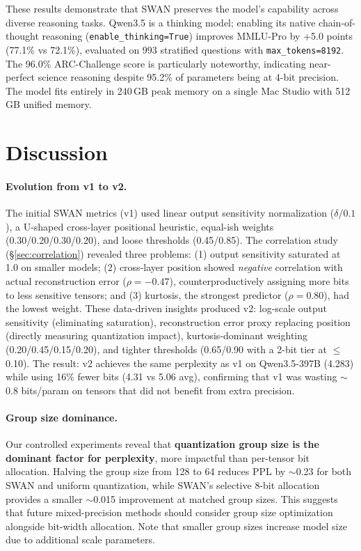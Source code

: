 \documentclass{article}
\begin{document}
These results demonstrate that SWAN preserves the model's capability across diverse reasoning tasks. Qwen3.5 is a thinking model; enabling its native chain-of-thought reasoning (\texttt{enable\_thinking=True}) improves MMLU-Pro by +5.0 points (77.1\% vs 72.1\%), evaluated on 993 stratified questions with \texttt{max\_tokens=8192}. The 96.0\% ARC-Challenge score is particularly noteworthy, indicating near-perfect science reasoning despite 95.2\% of parameters being at 4-bit precision. The model fits entirely in 240\,GB peak memory on a single Mac Studio with 512\,GB unified memory.

\section{Discussion}
\label{sec:discussion}

\paragraph{Evolution from v1 to v2.}
The initial SWAN metrics (v1) used linear output sensitivity normalization ($\delta / 0.1$), a U-shaped cross-layer positional heuristic, equal-ish weights (0.30/0.20/0.30/0.20), and loose thresholds (0.45/0.85). The correlation study (\S\ref{sec:correlation}) revealed three problems: (1) output sensitivity saturated at 1.0 on smaller models; (2) cross-layer position showed \emph{negative} correlation with actual reconstruction error ($\rho = -0.47$), counterproductively assigning more bits to less sensitive tensors; and (3) kurtosis, the strongest predictor ($\rho = 0.80$), had the lowest weight. These data-driven insights produced v2: log-scale output sensitivity (eliminating saturation), reconstruction error proxy replacing position (directly measuring quantization impact), kurtosis-dominant weighting (0.20/0.45/0.15/0.20), and tighter thresholds (0.65/0.90 with a 2-bit tier at $\leq$0.10). The result: v2 achieves the same perplexity as v1 on Qwen3.5-397B (4.283) while using 16\% fewer bits (4.31 vs 5.06 avg), confirming that v1 was wasting $\sim$0.8 bits/param on tensors that did not benefit from extra precision.

\paragraph{Group size dominance.}
Our controlled experiments reveal that \textbf{quantization group size is the dominant factor for perplexity}, more impactful than per-tensor bit allocation. Halving the group size from 128 to 64 reduces PPL by $\sim$0.23 for both SWAN and uniform quantization, while SWAN's selective 8-bit allocation provides a smaller $\sim$0.015 improvement at matched group sizes. This suggests that future mixed-precision methods should consider group size optimization alongside bit-width allocation. Note that smaller group sizes increase model size due to additional scale parameters.
\end{document}
